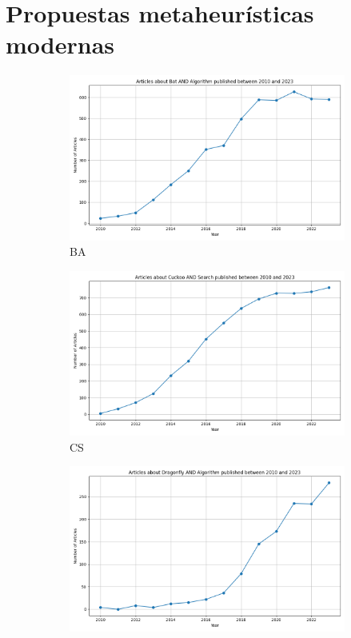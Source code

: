 \section{Propuestas metaheurísticas modernas}
\begin{figure}[H]
    \centering
    \begin{subfigure}[b]{0.45\textwidth}
      \includegraphics[width=\textwidth]{imagenes/scopus_chart_Bat_Algorithm.png}
      \caption{BA}
      \label{fig:bat_algorithm}
    \end{subfigure}
    \begin{subfigure}[b]{0.45\textwidth}
      \includegraphics[width=\textwidth]{imagenes/scopus_chart_Cuckoo_Search.png}
      \caption{CS}
      \label{fig:cuckoo_search}
    \end{subfigure}
    \begin{subfigure}[b]{0.45\textwidth}
      \includegraphics[width=\textwidth]{imagenes/scopus_chart_Dragonfly_Algorithm.png}

\end{subfigure}
\end{figure}
